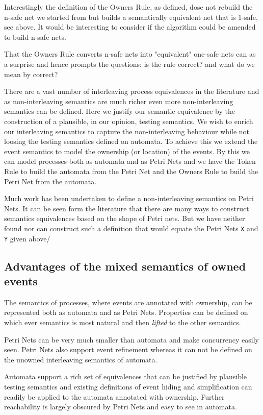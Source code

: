 \documentclass[]{article}
\begin{document}
Interestingly the definition of the Owners Rule, as defined,  dose not rebuild the n-safe net we started from but builds a semantically equivalent net that is 1-safe, see above. It would be interesting to consider if the algorithm could be amended to build n-safe nets.

That the Owners Rule converts n-safe nets into "equivalent" one-safe nets can as a surprise and hence prompts the questions: is the rule correct? and what do we mean by correct?

There are a vast number of interleaving process equivalences in the literature and as non-interleaving semantics are much richer  even more non-interleaving semantics can be defined. Here we justify our semantic equivalence by the construction of a plausible, in our opinion,  testing semantics. We wish to enrich our interleaving semantics to capture the non-interleaving behaviour while not loosing the testing semantics defined on automata. To achieve this we extend the event semantics to model the ownership (or location) of the events. By this we can model processes both as automata and as Petri Nets and we have the {\sf Token Rule} to build the automata from the Petri Net and the {\sf Owners Rule} to build the Petri Net from the automata.

Much work has been undertaken to define a non-interleaving semantics on Petri Nets. It can be seen form the literature that there are many ways to  construct semantics equivalences  based on the shape of  Petri nets.   But we have neither found nor can construct such a definition that would equate the Petri Nets \verb|X| and \verb|Y|  given above/

\subsection{Advantages of the mixed semantics of owned events}
The semantics of processes,  where events are annotated with ownership,
can be represented  both as automata and  as Petri Nets. Properties can be defined on which ever semantics is most natural and then \emph{lifted} to the other semantics. 

Petri Nets can be very much smaller than automata and make concurrency easily seen.   
Petri Nets also  support event refinement whereas it can not be defined on the unowned interleaving semantics of automata. 

Automata support a rich set of equivalences that can be justified by plausible testing semantics and existing definitions of event hiding and simplification can readily be applied to the automata annotated with ownership. Further reachability is largely obscured by Petri Nets and easy to see in automata.
\end{document}
